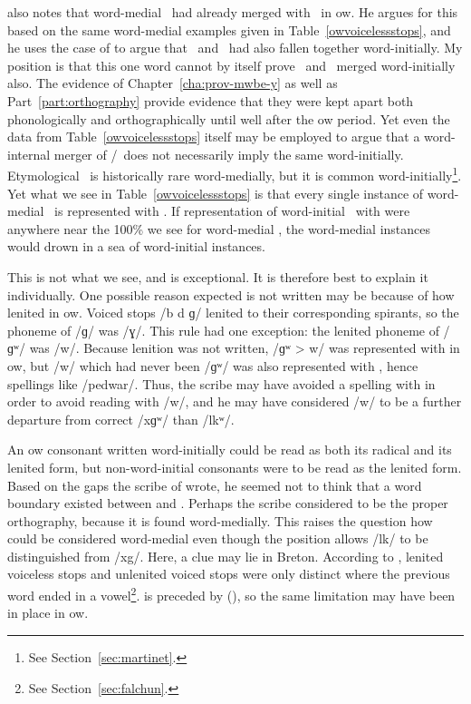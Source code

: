 \Textcite{Sch_Two01} also notes that word-medial \xD\ had already merged with \lT\ in \gls{ow}. He argues for this based on the same word-medial examples given in Table~\ref{owvoicelessstops}, and he uses the case of  to argue that \lT\ and \xD\ had also fallen together word-initially. My position is that this one word cannot by itself prove  \xD\ and \lT\ merged word-initially also. The evidence of Chapter~\ref{cha:prov-mwbe-y} as well as Part~\ref{part:orthography} provide evidence that they were kept apart both phonologically and orthographically until well after the \gls{ow} period. Yet even the data from Table~\ref{owvoicelessstops} itself may be employed to argue that a word-internal merger of \xD/\lT\ does not necessarily imply the same word-initially. Etymological \xD\ is historically rare word-medially, but it is common word-initially\footnote{See Section~\ref{sec:martinet}.}. Yet what we see in Table~\ref{owvoicelessstops} is that every single instance of word-medial \xD\ is represented with . If representation of word-initial \xD\ with  were anywhere near the 100\% we see for word-medial \xD, the word-medial instances would drown in a sea of word-initial instances. 

This is not what we see, and  is exceptional. It is therefore best to explain it individually. One possible reason expected  is not written may be because of how  lenited in \gls{ow}. Voiced stops /b d ɡ/ lenited to their corresponding spirants, so the phoneme of /ɡ/ was /ɣ/. This rule had one exception: the lenited phoneme of /ɡʷ/ was /w/. Because lenition was not written, /ɡʷ > w/ was represented with  in \gls{ow}, but /w/ which had never been /ɡʷ/ was also represented with , hence spellings like  /pedwar/. Thus, the scribe may have avoided a spelling with  in order to avoid reading with /w/, and he may have considered /w/ to be a further departure from correct /\gls{x}ɡʷ/ than /\gls{l}kʷ/.

An \gls{ow} consonant written word-initially could be read as both its radical and its  lenited form, but non-word-initial consonants were to be read as the lenited form. Based on the gaps the scribe of  wrote, he seemed not to think that a word boundary existed between  and . Perhaps the scribe considered  to be the proper orthography, because it is found word-medially. This raises the question how  could be considered word-medial even though the position allows /\gls{l}k/ to be distinguished from /\gls{x}g/. Here, a clue may lie in Breton. According to \textcite[64]{falchun_systeme_1951}, lenited voiceless stops and unlenited voiced stops were only distinct where the previous word ended in a vowel\footnote{See Section~\ref{sec:falchun}.}.  is preceded by  (), so the same limitation may have been in place in \gls{ow}.





